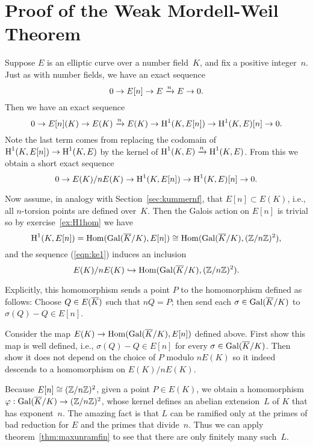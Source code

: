 \section{Proof of the Weak Mordell-Weil Theorem}
Suppose $E$ is an elliptic curve over a number field~$K$, and
fix a positive integer~$n$.
Just as with number fields, we have an exact sequence
$$
	0 \to E[n] \to E \xrightarrow{n} E \to 0.
$$
Then we have an exact sequence
$$
	0 \to E[n](K) \to E(K) \xrightarrow{n} E(K) \to \operatorname{H}^1(K,E[n]) \to \operatorname{H}^1(K,E)[n] \to 0.
$$
Note the last term comes from replacing the codomain of
$\operatorname{H}^1(K,E[n]) \to \operatorname{H}^1(K,E)$ by the kernel of $\operatorname{H}^1(K,E) \xrightarrow{n} \operatorname{H}^1(K,E)$.
From this we obtain a short exact sequence
\begin{equation}\label{eqn:ke1}
	0 \to E(K)/n E(K) \to \operatorname{H}^1(K,E[n]) \to \operatorname{H}^1(K,E)[n] \to 0.
\end{equation}

Now assume, in analogy with Section~\ref{sec:kummernf}, that
$E[n]\subset E(K)$, i.e., all $n$-torsion points are defined over~$K$.
Then the Galois action on $E[n]$ is trivial so by
exercise~\ref{ex:H1hom} we have
$$
	\H^1(K,E[n]) = \Hom(\Gal(\Kbar/K),E[n]) \cong %
	\Hom(\Gal(\Kbar/K),(\Z/n\Z)^2),
$$
and the sequence (\ref{eqn:ke1}) induces an inclusion
\begin{equation}\label{eqn:injmw}
	E(K)/n E(K) \hookrightarrow \operatorname{Hom}(\operatorname{Gal}(\overline{K}/K),(\mathbb{Z}/n\mathbb{Z})^2).
\end{equation}

Explicitly, this homomorphism sends a point $P$ to the homomorphism
defined as follows: Choose $Q \in E(\overline{K})$ such that $nQ = P$; then
send each $\sigma \in \operatorname{Gal}(\overline{K}/K)$ to $\sigma(Q)-Q\in E[n]$.

\begin{exercise}\label{ex:sigmaQ-QinEn}
	Consider the map $E(K) \to \operatorname{Hom}(\operatorname{Gal}(\overline{K}/K),E[n])$ defined above.
	First show this map is well defined, i.e., $\sigma(Q) - Q \in E[n]$
	for every $\sigma\in \operatorname{Gal}(\overline{K}/K)$.
	Then show it does not depend on the choice of $P$ modulo $nE(K)$
	so it indeed descends to a homomorphism on $E(K)/nE(K)$.
\end{exercise}

Because $E[n] \cong (\mathbb{Z}/n\mathbb{Z})^2$, %
given a point $P\in E(K)$, we obtain a homomorphism
$\varphi : \operatorname{Gal}(\overline{K}/K) \to (\mathbb{Z}/n\mathbb{Z})^2$, whose kernel defines an
abelian extension~$L$ of $K$ that has exponent~$n$.
The amazing fact is that $L$ can be ramified only at the primes
of bad reduction for $E$ and the primes that divide~$n$.
Thus we can apply theorem~\ref{thm:maxunramfin} to see that there are
only finitely many such~$L$.

